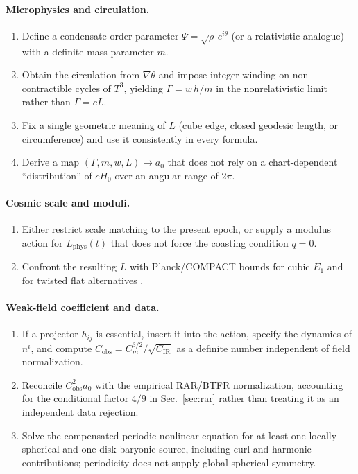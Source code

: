 \documentclass[aps,prd,reprint,superscriptaddress,nofootinbib,floatfix,showkeys]{revtex4-2}
\newcommand{\Tthree}{T^{3}}
\newcommand{\Cobs}{C_{\mathrm{obs}}}
\newcommand{\Cm}{C_{m}}
\newcommand{\CIR}{C_{\mathrm{IR}}}
\newcommand{\azero}{a_{0}}
\newcommand{\Hzero}{H_{0}}
\begin{document}
\paragraph{Microphysics and circulation.}
\begin{enumerate}
\item[(M1)] Define a condensate order parameter
  \(\Psi=\sqrt{\rho}\,e^{i\theta}\)
  (or a relativistic analogue) with a definite mass parameter \(m\).
\item[(M2)] Obtain the circulation from \(\nabla\theta\) and impose integer
  winding on non-contractible cycles of \(\Tthree\), yielding
  \(\Gamma=w\,h/m\) in the nonrelativistic limit rather than \(\Gamma=cL\).
\item[(M3)] Fix a single geometric meaning of \(L\)
  (cube edge, closed geodesic length, or circumference) and use it
  consistently in every formula.
\item[(M4)] Derive a map
  \((\Gamma,m,w,L)\mapsto\azero\)
  that does not rely on a chart-dependent ``distribution'' of \(c\Hzero\) over
  an angular range of \(2\pi\).
\end{enumerate}

\paragraph{Cosmic scale and moduli.}
\begin{enumerate}
\item[(S1)] Either restrict scale matching to the present epoch, or supply a
  modulus action for \(L_{\mathrm{phys}}(t)\) that does not force the
  coasting condition \(q=0\).
\item[(S2)] Confront the resulting \(L\) with Planck/COMPACT bounds for cubic
  \(E_1\) and for twisted flat alternatives \cite{planck_topology,compact_promise}.
\end{enumerate}

\paragraph{Weak-field coefficient and data.}
\begin{enumerate}
\item[(E1)] If a projector \(h_{ij}\) is essential, insert it into the action,
  specify the dynamics of \(n^{i}\), and compute
  \(\Cobs=\Cm^{3/2}/\sqrt{\CIR}\)
  as a definite number independent of field normalization.
\item[(E2)] Reconcile \(\Cobs^{2}\azero\) with the empirical RAR/BTFR
  normalization, accounting for the conditional factor \(4/9\) in
  Sec.~\ref{sec:rar} rather than treating it as an independent data rejection.
\item[(E3)] Solve the compensated periodic nonlinear equation for at least one
  locally spherical and one disk baryonic source, including curl and harmonic
  contributions; periodicity does not supply global spherical symmetry.
\end{enumerate}
\end{document}
